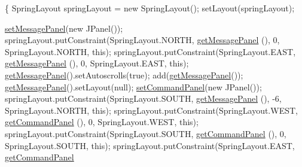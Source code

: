 \begin{DoxyCode}
                                  \{
        SpringLayout springLayout = \textcolor{keyword}{new} SpringLayout();
        setLayout(springLayout);

        \hyperlink{classcom_1_1poly_1_1nlp_1_1filekommander_1_1views_1_1panels_1_1_abstract_message_panel_a037813b2459d23f7a0ad69c261629d3a}{setMessagePanel}(\textcolor{keyword}{new} JPanel());
        springLayout.putConstraint(SpringLayout.NORTH, \hyperlink{classcom_1_1poly_1_1nlp_1_1filekommander_1_1views_1_1panels_1_1_abstract_message_panel_a2d8c613b03cb000425ae32a9a44dc805}{getMessagePanel}
      (), 0,
                SpringLayout.NORTH, \textcolor{keyword}{this});
        springLayout.putConstraint(SpringLayout.EAST, \hyperlink{classcom_1_1poly_1_1nlp_1_1filekommander_1_1views_1_1panels_1_1_abstract_message_panel_a2d8c613b03cb000425ae32a9a44dc805}{getMessagePanel}
      (), 0,
                SpringLayout.EAST, \textcolor{keyword}{this});
        \hyperlink{classcom_1_1poly_1_1nlp_1_1filekommander_1_1views_1_1panels_1_1_abstract_message_panel_a2d8c613b03cb000425ae32a9a44dc805}{getMessagePanel}().setAutoscrolls(\textcolor{keyword}{true});
        add(\hyperlink{classcom_1_1poly_1_1nlp_1_1filekommander_1_1views_1_1panels_1_1_abstract_message_panel_a2d8c613b03cb000425ae32a9a44dc805}{getMessagePanel}());
        \hyperlink{classcom_1_1poly_1_1nlp_1_1filekommander_1_1views_1_1panels_1_1_abstract_message_panel_a2d8c613b03cb000425ae32a9a44dc805}{getMessagePanel}().setLayout(null);
        \hyperlink{classcom_1_1poly_1_1nlp_1_1filekommander_1_1views_1_1panels_1_1_abstract_message_panel_ab3030d917dffd39a79418b3eeb0fbd83}{setCommandPanel}(\textcolor{keyword}{new} JPanel());
        springLayout.putConstraint(SpringLayout.SOUTH, \hyperlink{classcom_1_1poly_1_1nlp_1_1filekommander_1_1views_1_1panels_1_1_abstract_message_panel_a2d8c613b03cb000425ae32a9a44dc805}{getMessagePanel}
      (), -6,
                SpringLayout.NORTH, \textcolor{keyword}{this});
        springLayout.putConstraint(SpringLayout.WEST, \hyperlink{classcom_1_1poly_1_1nlp_1_1filekommander_1_1views_1_1panels_1_1_abstract_message_panel_a20b6fcda2f2cbd8aa5973d6c08b9690a}{getCommandPanel}
      (), 0,
                SpringLayout.WEST, \textcolor{keyword}{this});
        springLayout.putConstraint(SpringLayout.SOUTH, \hyperlink{classcom_1_1poly_1_1nlp_1_1filekommander_1_1views_1_1panels_1_1_abstract_message_panel_a20b6fcda2f2cbd8aa5973d6c08b9690a}{getCommandPanel}
      (), 0,
                SpringLayout.SOUTH, \textcolor{keyword}{this});
        springLayout.putConstraint(SpringLayout.EAST, \hyperlink{classcom_1_1poly_1_1nlp_1_1filekommander_1_1views_1_1panels_1_1_abstract_message_panel_a20b6fcda2f2cbd8aa5973d6c08b9690a}{getCommandPanel}

\end{DoxyCode}
